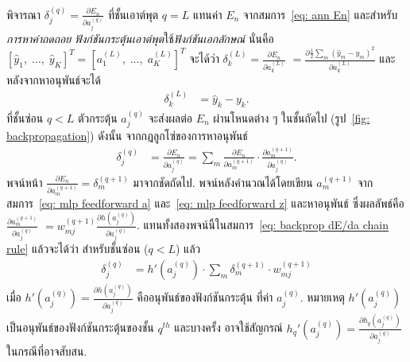 พิจารณา $\delta_j^{(q)} = \frac{\partial E_n}{\partial a_j^{(q)}}$ ที่ชั้นเอาต์พุต $q = L$
แทนค่า $E_n$ จากสมการ~\ref{eq: ann En} และสำหรับ\textit{การหาค่าถดถอย} \textit{ฟังก์ชันกระตุ้นเอาต์พุต}ใช้\textit{ฟังก์ชันเอกลักษณ์} นั่นคือ $[\hat{y}_1, \; \ldots, \; \hat{y}_K]^T = [a_1^{(L)}, \; \ldots, \; a_K^{(L)}]^T$
จะได้ว่า
$\delta_k^{(L)} = \frac{\partial E_n}{\partial a_k^{(L)}}$
$= \frac{\partial \frac{1}{2} \sum_m (\hat{y}_m - y_m)^2}{\partial a_k^{(L)}}$
และหลังจากหาอนุพันธ์จะได้
\begin{align}
\delta_k^{(L)}
&
= \hat{y}_k - y_k
\label{eq: backprop delta L}.
\end{align}
ที่ชั้นซ่อน $q < L$ 
ตัวกระตุ้น $a_j^{(q)}$ จะส่งผลต่อ $E_n$ ผ่านโหนดต่าง ๆ ในชั้นถัดไป (รูป~\ref{fig: backpropagation})
ดังนั้น
จากกฎลูกโซ่ของการหาอนุพันธ์
\begin{align}
\delta_j^{(q)} &
= \frac{\partial E_n}{\partial a_j^{(q)}}
= 
\sum_m \frac{\partial E_n}{\partial a_m^{(q+1)}} \cdot \frac{\partial a_m^{(q+1)}}{\partial a_j^{(q)}}
\label{eq: backprop dE/da chain rule}.
\end{align}
พจน์หน้า $\frac{\partial E_n}{\partial a_m^{(q+1)}} = \delta_m^{(q+1)}$
มาจากชัดถัดไป.
พจน์หลังคำนวณได้โดยเขียน $a_m^{(q+1)}$
จากสมการ~\ref{eq: mlp feedforward a} และ~\ref{eq: mlp feedforward z}
และหาอนุพันธ์
ซึ่งผลลัพธ์คือ
$\frac{\partial a_m^{(q+1)}}{\partial a_j^{(q)}}$
$= w_{mj}^{(q+1)} \frac{\partial h(a_j^{(q)})}{\partial a_j^{(q)}}$.
แทนทั้งสองพจน์นี้ในสมการ~\ref{eq: backprop dE/da chain rule} แล้วจะได้ว่า สำหรับชั้นซ่อน ($q < L$)
แล้ว
\begin{align}
\delta_j^{(q)} 
& = h'(a_j^{(q)}) \cdot \sum_m \delta_m^{(q+1)} \cdot w_{mj}^{(q+1)}
\label{eq: backprop delta q < L}
\end{align}
เมื่อ $h'(a_j^{(q)}) = \frac{\partial h(a_j^{(q)})}{\partial a_j^{(q)}}$ คืออนุพันธ์ของฟังก์ชันกระตุ้น
ที่ค่า $a_j^{(q)}$.
หมายเหตุ  $h'(a_j^{(q)})$ เป็นอนุพันธ์ของฟังก์ชันกระตุ้นของชั้น $q^{th}$
และบางครั้ง
อาจใช้สัญกรณ์ $h_q'(a_j^{(q)}) = \frac{\partial h_q(a_j^{(q)})}{\partial a_j^{(q)}}$
ในกรณีที่อาจสับสน.

